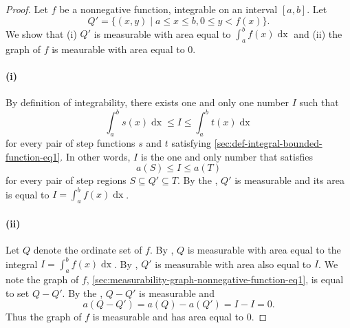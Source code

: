 \documentclass{report}
\begin{document}
\begin{proof}

  Let $f$ be a nonnegative function, integrable on an interval $[a, b]$.
  Let $$Q' = \{(x, y) \mid a \leq x \leq b, 0 \leq y < f(x)\}.$$
  We show that (i) $Q'$ is measurable with area equal to
    $\int_a^b f(x) \mathop{dx}$ and (ii) the graph of $f$ is meaurable with area
    equal to $0$.

  \paragraph{(i)}%
  \label{par:measurability-graph-nonnegative-function-i}

    By definition of integrability, there exists one and only one number $I$
      such that
      $$\int_a^b s(x) \mathop{dx} \leq I \leq \int_a^b t(x) \mathop{dx}$$
      for every pair of step functions $s$ and $t$ satisfying
      \eqref{sec:def-integral-bounded-function-eq1}.
    In other words, $I$ is the one and only number that satisfies
      $$a(S) \leq I \leq a(T)$$ for every pair of step regions
      $S \subseteq Q' \subseteq T$.
    By the , $Q'$ is measurable and its
      area is equal to $I = \int_a^b f(x) \mathop{dx}$.

  \paragraph{(ii)}%

    Let $Q$ denote the ordinate set of $f$.
    By , $Q$ is measurable with area
      equal to the integral $I = \int_a^b f(x) \mathop{dx}$.
    By , $Q'$ is
      measurable with area also equal to $I$.
    We note the graph of $f$,
      \eqref{sec:measurability-graph-nonnegative-function-eq1}, is equal to set
      $Q - Q'$.
    By the , $Q - Q'$ is measurable and
      $$a(Q - Q') = a(Q) - a(Q') = I - I = 0.$$
    Thus the graph of $f$ is measurable and has area equal to $0$.

\end{proof}

\section
  [\partial{Integrability of Bounded Monotonic Functions}]
  {}
\label{sec:integrability-bounded-monotonic-functions}
\label{sec:theorem-1.12}
\end{document}
